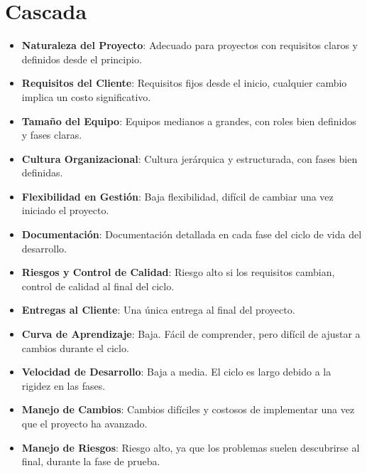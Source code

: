 \section{Cascada}
\begin{itemize}
    \item \textbf{Naturaleza del Proyecto}: Adecuado para proyectos con requisitos claros y definidos desde el principio.
    \item \textbf{Requisitos del Cliente}: Requisitos fijos desde el inicio, cualquier cambio implica un costo significativo.
    \item \textbf{Tamaño del Equipo}: Equipos medianos a grandes, con roles bien definidos y fases claras.
    \item \textbf{Cultura Organizacional}: Cultura jerárquica y estructurada, con fases bien definidas.
    \item \textbf{Flexibilidad en Gestión}: Baja flexibilidad, difícil de cambiar una vez iniciado el proyecto.
    \item \textbf{Documentación}: Documentación detallada en cada fase del ciclo de vida del desarrollo.
    \item \textbf{Riesgos y Control de Calidad}: Riesgo alto si los requisitos cambian, control de calidad al final del ciclo.
    \item \textbf{Entregas al Cliente}: Una única entrega al final del proyecto.
    \item \textbf{Curva de Aprendizaje}: Baja. Fácil de comprender, pero difícil de ajustar a cambios durante el ciclo.
    \item \textbf{Velocidad de Desarrollo}: Baja a media. El ciclo es largo debido a la rigidez en las fases.
    \item \textbf{Manejo de Cambios}: Cambios difíciles y costosos de implementar una vez que el proyecto ha avanzado.
    \item \textbf{Manejo de Riesgos}: Riesgo alto, ya que los problemas suelen descubrirse al final, durante la fase de prueba.
\end{itemize}

